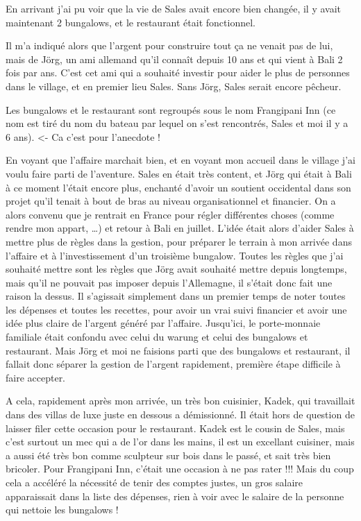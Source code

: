 En arrivant j’ai pu voir que la vie de Sales avait encore bien changée, il y avait maintenant 2 bungalows, et le restaurant était fonctionnel.

Il m’a indiqué alors que l’argent pour construire tout ça ne venait pas de lui, mais de Jörg, un ami allemand qu’il connaît depuis 10 ans et qui vient à Bali 2 fois par ans. C’est cet ami qui a souhaité investir pour aider le plus de personnes dans le village, et en premier lieu Sales. Sans Jörg, Sales serait encore pêcheur.

Les bungalows et le restaurant sont regroupés sous le nom Frangipani Inn (ce nom est tiré du nom du bateau par lequel on s’est rencontrés, Sales et moi il y a 6 ans). <- Ca c’est pour l’anecdote !

En voyant que l’affaire marchait bien, et en voyant mon accueil dans le village j’ai voulu faire parti de l’aventure. Sales en était très content, et Jörg qui était à Bali à ce moment l’était encore plus, enchanté d’avoir un soutient occidental dans son projet qu’il tenait à bout de bras au niveau organisationnel et financier. On a alors convenu que je rentrait en France pour régler différentes choses (comme rendre mon appart, …) et retour à Bali en juillet. L’idée était alors d’aider Sales à mettre plus de règles dans la gestion, pour préparer le terrain à mon arrivée dans l’affaire et à l’investissement d’un troisième bungalow. Toutes les règles que j’ai souhaité mettre sont les règles que Jörg avait souhaité mettre depuis longtemps, mais qu’il ne pouvait pas imposer depuis l’Allemagne, il s’était donc fait une raison la dessus. Il s’agissait simplement dans un premier temps de noter toutes les dépenses et toutes les recettes, pour avoir un vrai suivi financier et avoir une idée plus claire de l’argent généré par l’affaire. Jusqu’ici, le porte-monnaie familiale était confondu avec celui du warung et celui des bungalows et restaurant. Mais Jörg et moi ne faisions parti que des bungalows et restaurant, il fallait donc séparer la gestion de l’argent rapidement, première étape difficile à faire accepter.

A cela, rapidement après mon arrivée, un très bon cuisinier, Kadek, qui travaillait dans des villas de luxe juste en dessous a démissionné. Il était hors de question de laisser filer cette occasion pour le restaurant. Kadek est le cousin de Sales, mais c’est surtout un mec qui a de l’or dans les mains, il est un excellant cuisiner, mais a aussi été très bon comme sculpteur sur bois dans le passé, et sait très bien bricoler. Pour Frangipani Inn, c’était une occasion à ne pas rater !!! Mais du coup cela a accéléré la nécessité de tenir des comptes justes, un gros salaire apparaissait dans la liste des dépenses, rien à voir avec le salaire de la personne qui nettoie les bungalows !

